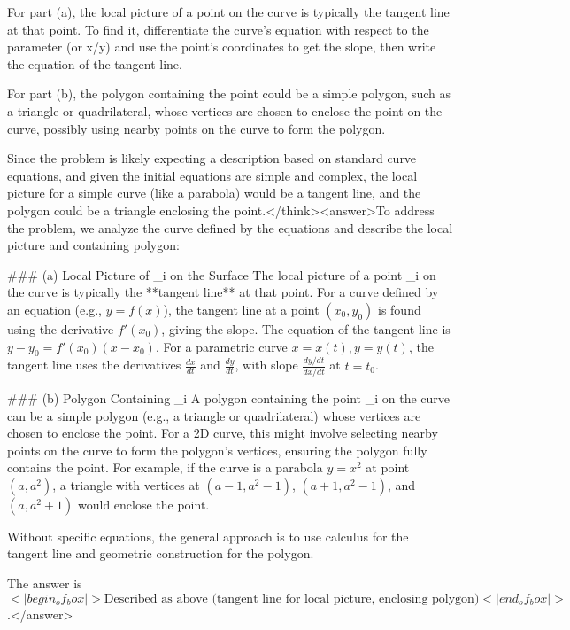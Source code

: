 For part (a), the local picture of a point on the curve is typically the tangent line at that point. To find it, differentiate the curve's equation with respect to the parameter (or x/y) and use the point's coordinates to get the slope, then write the equation of the tangent line.

For part (b), the polygon containing the point could be a simple polygon, such as a triangle or quadrilateral, whose vertices are chosen to enclose the point on the curve, possibly using nearby points on the curve to form the polygon.

Since the problem is likely expecting a description based on standard curve equations, and given the initial equations are simple and complex, the local picture for a simple curve (like a parabola) would be a tangent line, and the polygon could be a triangle enclosing the point.</think><answer>To address the problem, we analyze the curve defined by the equations and describe the local picture and containing polygon:  

### (a) Local Picture of _i on the Surface  
The local picture of a point _i on the curve is typically the **tangent line** at that point. For a curve defined by an equation (e.g., \( y = f(x) \)), the tangent line at a point \((x_0, y_0)\) is found using the derivative \( f'(x_0) \), giving the slope. The equation of the tangent line is \( y - y_0 = f'(x_0)(x - x_0) \). For a parametric curve \( x = x(t), y = y(t) \), the tangent line uses the derivatives \( \frac{dx}{dt} \) and \( \frac{dy}{dt} \), with slope \( \frac{dy/dt}{dx/dt} \) at \( t = t_0 \).  

### (b) Polygon Containing _i  
A polygon containing the point _i on the curve can be a simple polygon (e.g., a triangle or quadrilateral) whose vertices are chosen to enclose the point. For a 2D curve, this might involve selecting nearby points on the curve to form the polygon’s vertices, ensuring the polygon fully contains the point. For example, if the curve is a parabola \( y = x^2 \) at point \((a, a^2)\), a triangle with vertices at \((a-1, a^2-1)\), \((a+1, a^2-1)\), and \((a, a^2+1)\) would enclose the point.  

Without specific equations, the general approach is to use calculus for the tangent line and geometric construction for the polygon.  

The answer is \(<|begin_of_box|>\text{Described as above (tangent line for local picture, enclosing polygon)}<|end_of_box|>\).</answer>